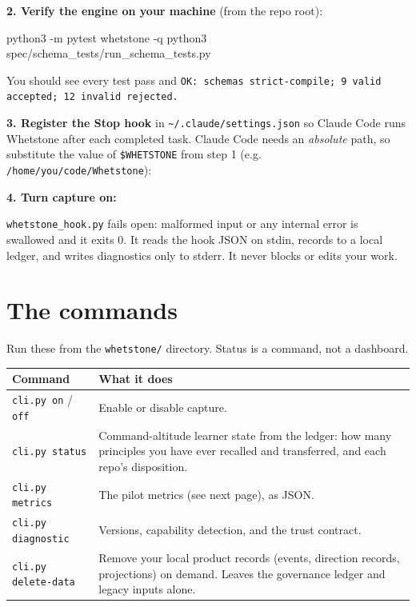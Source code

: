 \documentclass[11pt]{article}
\newcommand{\code}[1]{\textcolor{ink}{\texttt{#1}}}
\begin{document}
\textbf{2. Verify the engine on your machine} (from the repo root):
\begin{term}
python3 -m pytest whetstone -q
python3 spec/schema_tests/run_schema_tests.py
\end{term}
You should see every test pass and \code{OK: schemas strict-compile; 9 valid accepted; 12 invalid rejected.}

\textbf{3. Register the Stop hook} in \code{\textasciitilde/.claude/settings.json} so Claude Code
runs Whetstone after each completed task. Claude Code needs an \emph{absolute} path, so
substitute the value of \code{\$WHETSTONE} from step 1 (e.g. \code{/home/you/code/Whetstone}):

\textbf{4. Turn capture on:}

\begin{tip}
\code{whetstone\_hook.py} fails open: malformed input or any internal error is swallowed
and it exits 0. It reads the hook JSON on stdin, records to a local ledger, and writes
diagnostics only to stderr. It never blocks or edits your work.
\end{tip}

\section{The commands}

Run these from the \code{whetstone/} directory. Status is a command, not a dashboard.

\begin{center}\small
\begin{tabular}{@{}p{3.4cm}p{10.4cm}@{}}
\toprule
\textbf{Command} & \textbf{What it does} \\
\midrule
\code{cli.py on} / \code{off} & Enable or disable capture. \\
\code{cli.py status} & Command-altitude learner state from the ledger: how many principles
you have ever recalled and transferred, and each repo's disposition. \\
\code{cli.py metrics} & The pilot metrics (see next page), as JSON. \\
\code{cli.py diagnostic} & Versions, capability detection, and the trust contract. \\
\code{cli.py delete-data} & Remove your local product records (events, direction records,
projections) on demand. Leaves the governance ledger and legacy inputs alone. \\
\bottomrule
\end{tabular}
\end{center}
\end{document}
